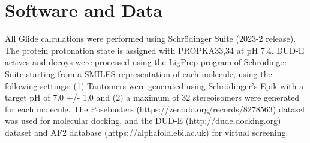 \section{Software and Data}

All Glide calculations were performed using Schr\"odinger Suite (2023-2 release). The protein protonation state is assigned with PROPKA33,34 at pH 7.4. DUD-E actives and decoys were processed using the LigPrep program of Schr\"odinger Suite starting from a SMILES representation of each molecule, using the following settings: (1) Tautomers were generated using Schr\"odinger's Epik with a target pH of 7.0 +/- 1.0 and (2) a maximum of 32 stereoisomers were generated for each molecule. The Posebusters (https://zenodo.org/records/8278563) dataset was used for molecular docking, and the DUD-E (http://dude.docking.org) dataset and AF2 database (https://alphafold.ebi.ac.uk) for virtual screening.
